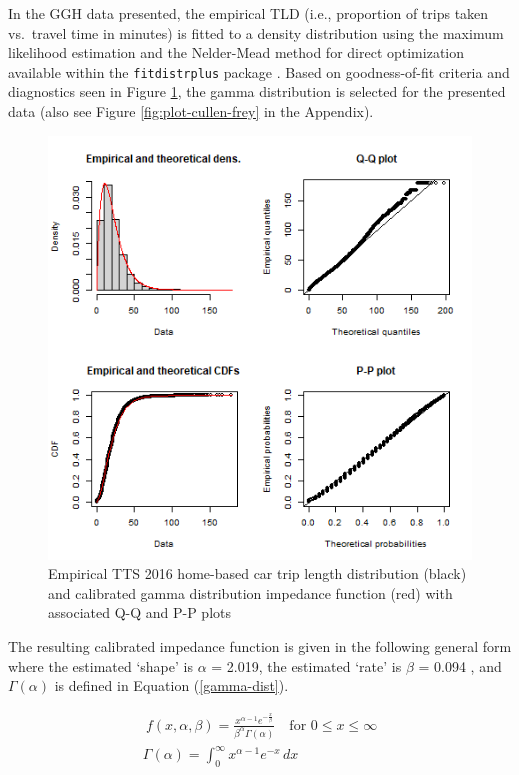 \documentclass[Royal,times,sageh]{sagej}
\begin{document}
In the GGH data presented, the empirical TLD (i.e., proportion of trips
taken vs.~travel time in minutes) is fitted to a density distribution
using the maximum likelihood estimation and the Nelder-Mead method for
direct optimization available within the \texttt{fitdistrplus} package
\citep{fitdistrplus_2015}. Based on goodness-of-fit criteria and
diagnostics seen in Figure \ref{fig:TLD-Gamma-plot}, the gamma
distribution is selected for the presented data (also see Figure
\ref{fig:plot-cullen-frey} in the Appendix).

\begin{figure}
\includegraphics[width=1\linewidth]{images/impedance_function} \caption{\label{fig:TLD-Gamma-plot}Empirical TTS 2016 home-based car trip length distribution (black) and calibrated gamma distribution impedance function (red) with associated Q-Q and P-P plots}\label{fig:TLD-Gamma-plot}
\end{figure}

The resulting calibrated impedance function is given in the following
general form where the estimated `shape' is \(\alpha\) = 2.019, the
estimated `rate' is \(\beta\) = 0.094 , and \(\Gamma(\alpha)\) is
defined in Equation (\ref{gamma-dist}).

\begin{equation}
\label{gamma-dist}
\begin{array}{l}\ 
f(x, \alpha, \beta) = \frac {x^{\alpha-1}e^{-\frac{x}{\beta}}}{ \beta^{\alpha}\Gamma(\alpha)} \quad \text{for } 0 \leq x \leq \infty\\
\Gamma(\alpha) =  \int_{0}^{\infty} x^{\alpha-1}e^{-x} \,dx\\
\end{array}
\end{equation}
\end{document}
